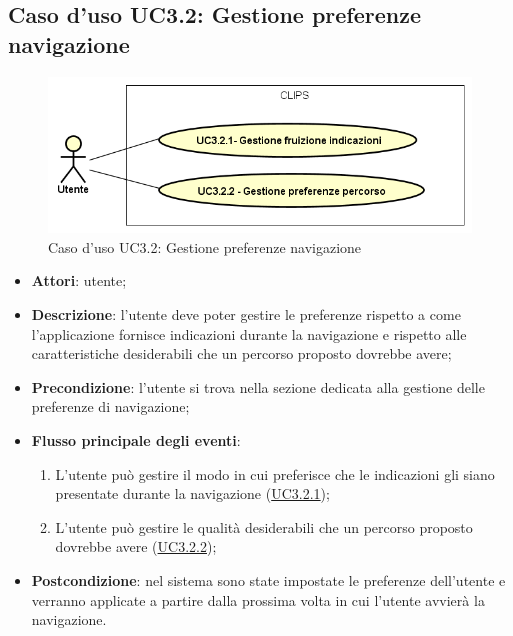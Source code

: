 \documentclass[../AnalisiDeiRequisiti.tex]{subfiles}
\begin{document}
\subsection{Caso d'uso UC3.2: Gestione preferenze navigazione}

        \begin{figure}[!h]
            \centering
            \includegraphics[scale=0.95, width=\textwidth]{img/UC3-2.png}
            \caption{Caso d'uso UC3.2: Gestione preferenze navigazione}\label{fig:UC3.2} 
        \end{figure}
\begin{itemize}
\item \textbf{Attori}: utente;
\item \textbf{Descrizione}: l'utente deve poter gestire le preferenze rispetto a come l'applicazione fornisce indicazioni durante la navigazione e rispetto alle caratteristiche desiderabili che un percorso proposto dovrebbe avere; 
      \item \textbf{Precondizione}: l'utente si trova nella sezione dedicata alla gestione delle preferenze di navigazione;

        \item \textbf{Flusso principale degli eventi}:
          \begin{enumerate}
          \item L'utente può gestire il modo in cui preferisce che le indicazioni gli siano presentate durante la navigazione (\hyperlink{UC3.2.1}{UC3.2.1});
          \item L'utente può gestire le qualità desiderabili che un percorso proposto dovrebbe avere (\hyperlink{UC3.2.2}{UC3.2.2});

      \end{enumerate}
    \item \textbf{Postcondizione}: nel sistema sono state impostate le preferenze dell'utente e verranno applicate a partire dalla prossima volta in cui l'utente avvierà la navigazione.
  \end{itemize}
\hypertarget{UC3.2.1}{}
\end{document}
